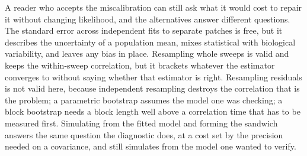A reader who accepts the miscalibration can still ask what it would cost to repair it without changing likelihood, and the alternatives answer different questions. The standard error across independent fits to separate patches is free, but it describes the uncertainty of a population mean, mixes statistical with biological variability, and leaves any bias in place. Resampling whole sweeps is valid and keeps the within-sweep correlation, but it brackets whatever the estimator converges to without saying whether that estimator is right. Resampling residuals is not valid here, because independent resampling destroys the correlation that is the problem; a parametric bootstrap assumes the model one was checking; a block bootstrap needs a block length well above a correlation time that has to be measured first. Simulating from the fitted model and forming the sandwich answers the same question the diagnostic does, at a cost set by the precision needed on a covariance, and still simulates from the model one wanted to verify.


